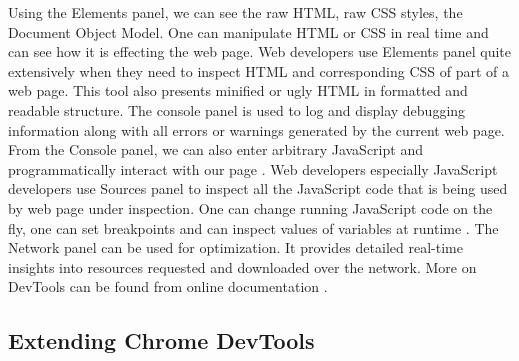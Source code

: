 Using the Elements panel, we can see the raw HTML, raw CSS styles, the Document Object Model. One can manipulate HTML or CSS in real time and can see how it is effecting the web page. Web developers use Elements panel quite extensively when they need to inspect HTML and corresponding CSS of part of a web page. This tool also presents minified or ugly HTML in formatted and readable structure. The console panel is used to log and display debugging information along with all errors or warnings generated by the current web page. From the Console panel, we can also enter arbitrary JavaScript and programmatically interact with our page \cite{CCDT}. Web developers especially JavaScript developers use Sources panel to inspect all the JavaScript code that is being used by web page under inspection. One can change running JavaScript code on the fly, one can set breakpoints and can inspect values of variables at runtime \cite{JSDebCDT}. The Network panel can be used for optimization. It provides detailed real-time insights into resources requested and downloaded over the network. More on DevTools can be found from online documentation \cite{CDT}.

\subsection{Extending Chrome DevTools} 	\label{subsec:Extending_Chrome_DevTools}

